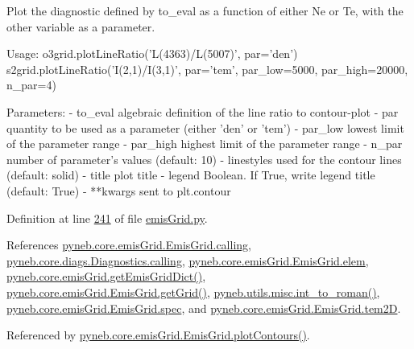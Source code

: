 \begin{DoxyVerb}Plot the diagnostic defined by to_eval as a function of either Ne or Te, with the other
variable as a parameter.

Usage:
    o3grid.plotLineRatio('L(4363)/L(5007)', par='den')
    s2grid.plotLineRatio('I(2,1)/I(3,1)', par='tem', par_low=5000, par_high=20000, n_par=4)

Parameters:
    - to_eval      algebraic definition of the line ratio to contour-plot
    - par          quantity to be used as a parameter (either 'den' or 'tem')
    - par_low      lowest limit of the parameter range
    - par_high     highest limit of the parameter range
    - n_par        number of parameter's values (default: 10)
    - linestyles   used for the contour lines (default: solid)
    - title        plot title
    - legend       Boolean. If True, write legend title (default: True) 
    - **kwargs     sent to plt.contour\end{DoxyVerb}
 

Definition at line \hyperlink{emis_grid_8py_source_l00241}{241} of file \hyperlink{emis_grid_8py_source}{emis\-Grid.\-py}.



References \hyperlink{emis_grid_8py_source_l00044}{pyneb.\-core.\-emis\-Grid.\-Emis\-Grid.\-calling}, \hyperlink{diags_8py_source_l00169}{pyneb.\-core.\-diags.\-Diagnostics.\-calling}, \hyperlink{emis_grid_8py_source_l00048}{pyneb.\-core.\-emis\-Grid.\-Emis\-Grid.\-elem}, \hyperlink{emis_grid_8py_source_l00315}{pyneb.\-core.\-emis\-Grid.\-get\-Emis\-Grid\-Dict()}, \hyperlink{emis_grid_8py_source_l00114}{pyneb.\-core.\-emis\-Grid.\-Emis\-Grid.\-get\-Grid()}, \hyperlink{misc_8py_source_l00055}{pyneb.\-utils.\-misc.\-int\-\_\-to\-\_\-roman()}, \hyperlink{emis_grid_8py_source_l00049}{pyneb.\-core.\-emis\-Grid.\-Emis\-Grid.\-spec}, and \hyperlink{emis_grid_8py_source_l00091}{pyneb.\-core.\-emis\-Grid.\-Emis\-Grid.\-tem2\-D}.



Referenced by \hyperlink{emis_grid_8py_source_l00182}{pyneb.\-core.\-emis\-Grid.\-Emis\-Grid.\-plot\-Contours()}.


